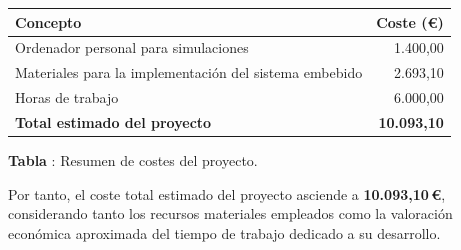 \begin{center}
\label{tab:resumen-costes-proyecto}
\renewcommand{\arraystretch}{1.2}
\begin{tabular}{|p{9cm}|r|}
\hline
\textbf{Concepto} & \textbf{Coste (€)} \\
\hline
Ordenador personal para simulaciones & 1.400,00 \\
\hline
Materiales para la implementación del sistema embebido & 2.693,10 \\
\hline
Horas de trabajo & 6.000,00 \\
\hline
\textbf{Total estimado del proyecto} & \textbf{10.093,10} \\
\hline
\end{tabular}
\par\vspace{0.3cm}
{\small \textbf{Tabla \thetable}: Resumen de costes del proyecto.}
\end{center}

Por tanto, el coste total estimado del proyecto asciende a \textbf{10.093,10\,€}, considerando tanto los recursos materiales empleados como la valoración económica aproximada del tiempo de trabajo dedicado a su desarrollo.
